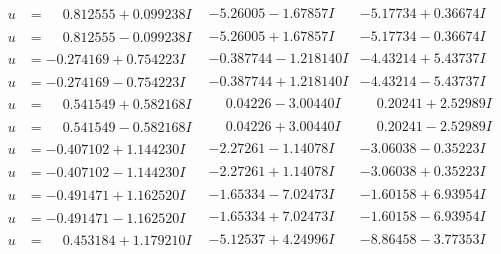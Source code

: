 \documentclass[1p]{elsarticle_modified}
\theoremstyle{definition}
\begin{document}
$$\begin{array}{c|c|c}
\begin{aligned}
u &= \phantom{-}0.812555 + 0.099238 I\end{aligned}
 & -5.26005 - 1.67857 I & -5.17734 + 0.36674 I \\ \hline\begin{aligned}
u &= \phantom{-}0.812555 - 0.099238 I\end{aligned}
 & -5.26005 + 1.67857 I & -5.17734 - 0.36674 I \\ \hline\begin{aligned}
u &= -0.274169 + 0.754223 I\end{aligned}
 & -0.387744 - 1.218140 I & -4.43214 + 5.43737 I \\ \hline\begin{aligned}
u &= -0.274169 - 0.754223 I\end{aligned}
 & -0.387744 + 1.218140 I & -4.43214 - 5.43737 I \\ \hline\begin{aligned}
u &= \phantom{-}0.541549 + 0.582168 I\end{aligned}
 & \phantom{-}0.04226 - 3.00440 I & \phantom{-}0.20241 + 2.52989 I \\ \hline\begin{aligned}
u &= \phantom{-}0.541549 - 0.582168 I\end{aligned}
 & \phantom{-}0.04226 + 3.00440 I & \phantom{-}0.20241 - 2.52989 I \\ \hline\begin{aligned}
u &= -0.407102 + 1.144230 I\end{aligned}
 & -2.27261 - 1.14078 I & -3.06038 - 0.35223 I \\ \hline\begin{aligned}
u &= -0.407102 - 1.144230 I\end{aligned}
 & -2.27261 + 1.14078 I & -3.06038 + 0.35223 I \\ \hline\begin{aligned}
u &= -0.491471 + 1.162520 I\end{aligned}
 & -1.65334 - 7.02473 I & -1.60158 + 6.93954 I \\ \hline\begin{aligned}
u &= -0.491471 - 1.162520 I\end{aligned}
 & -1.65334 + 7.02473 I & -1.60158 - 6.93954 I \\ \hline\begin{aligned}
u &= \phantom{-}0.453184 + 1.179210 I\end{aligned}
 & -5.12537 + 4.24996 I & -8.86458 - 3.77353 I \\ \hline\begin{aligned}

\end{aligned}
\end{array}$$
\end{document}
